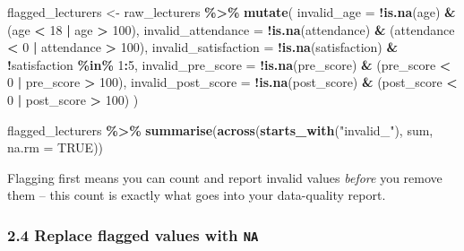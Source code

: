 \documentclass[11pt]{article}
\newenvironment{Shaded}{\begin{snugshade}}{\end{snugshade}}
\newcommand{\AttributeTok}[1]{\textcolor[rgb]{0.13,0.29,0.53}{#1}}
\newcommand{\ConstantTok}[1]{\textcolor[rgb]{0.56,0.35,0.01}{#1}}
\newcommand{\DecValTok}[1]{\textcolor[rgb]{0.00,0.00,0.81}{#1}}
\newcommand{\FunctionTok}[1]{\textcolor[rgb]{0.13,0.29,0.53}{\textbf{#1}}}
\newcommand{\NormalTok}[1]{#1}
\newcommand{\OtherTok}[1]{\textcolor[rgb]{0.56,0.35,0.01}{#1}}
\newcommand{\SpecialCharTok}[1]{\textcolor[rgb]{0.81,0.36,0.00}{\textbf{#1}}}
\newcommand{\StringTok}[1]{\textcolor[rgb]{0.31,0.60,0.02}{#1}}
\begin{document}
\begin{Shaded}
\begin{Highlighting}[]
\NormalTok{flagged\_lecturers }\OtherTok{\textless{}{-}}\NormalTok{ raw\_lecturers }\SpecialCharTok{\%\textgreater{}\%}
  \FunctionTok{mutate}\NormalTok{(}
    \AttributeTok{invalid\_age =} \SpecialCharTok{!}\FunctionTok{is.na}\NormalTok{(age) }\SpecialCharTok{\&}\NormalTok{ (age }\SpecialCharTok{\textless{}} \DecValTok{18} \SpecialCharTok{|}\NormalTok{ age }\SpecialCharTok{\textgreater{}} \DecValTok{100}\NormalTok{),}
    \AttributeTok{invalid\_attendance =} \SpecialCharTok{!}\FunctionTok{is.na}\NormalTok{(attendance) }\SpecialCharTok{\&}\NormalTok{ (attendance }\SpecialCharTok{\textless{}} \DecValTok{0} \SpecialCharTok{|}\NormalTok{ attendance }\SpecialCharTok{\textgreater{}} \DecValTok{100}\NormalTok{),}
    \AttributeTok{invalid\_satisfaction =} \SpecialCharTok{!}\FunctionTok{is.na}\NormalTok{(satisfaction) }\SpecialCharTok{\&} \SpecialCharTok{!}\NormalTok{satisfaction }\SpecialCharTok{\%in\%} \DecValTok{1}\SpecialCharTok{:}\DecValTok{5}\NormalTok{,}
    \AttributeTok{invalid\_pre\_score =} \SpecialCharTok{!}\FunctionTok{is.na}\NormalTok{(pre\_score) }\SpecialCharTok{\&}\NormalTok{ (pre\_score }\SpecialCharTok{\textless{}} \DecValTok{0} \SpecialCharTok{|}\NormalTok{ pre\_score }\SpecialCharTok{\textgreater{}} \DecValTok{100}\NormalTok{),}
    \AttributeTok{invalid\_post\_score =} \SpecialCharTok{!}\FunctionTok{is.na}\NormalTok{(post\_score) }\SpecialCharTok{\&}\NormalTok{ (post\_score }\SpecialCharTok{\textless{}} \DecValTok{0} \SpecialCharTok{|}\NormalTok{ post\_score }\SpecialCharTok{\textgreater{}} \DecValTok{100}\NormalTok{)}
\NormalTok{  )}

\NormalTok{flagged\_lecturers }\SpecialCharTok{\%\textgreater{}\%}
  \FunctionTok{summarise}\NormalTok{(}\FunctionTok{across}\NormalTok{(}\FunctionTok{starts\_with}\NormalTok{(}\StringTok{"invalid\_"}\NormalTok{), sum, }\AttributeTok{na.rm =} \ConstantTok{TRUE}\NormalTok{))}
\end{Highlighting}
\end{Shaded}

Flagging first means you can count and report invalid values
\emph{before} you remove them -- this count is exactly what goes into
your data-quality report.

\hypertarget{replace-flagged-values-with-na}{%
\subsubsection{\texorpdfstring{2.4 Replace flagged values with
\texttt{NA}}{2.4 Replace flagged values with NA}}\label{replace-flagged-values-with-na}}
\end{document}
